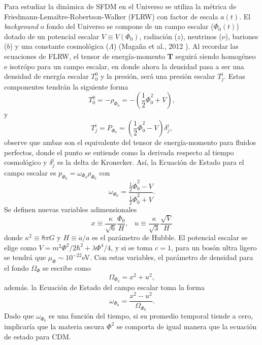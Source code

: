 \documentclass[a4paper,openright,12pt]{book}
\begin{document}
Para estudiar la dinámica de SFDM en el Universo se utiliza la métrica de Friedmann-Lemaître-Robertson-Walker (FLRW) con factor de escala $a(t)$. El \textit{background} o fondo del Universo se compone de un campo escalar ($\Phi_{0}(t)$) dotado de un potencial escalar $V \equiv V(\Phi_{0})$, radiación ($z$), neutrinos ($\nu$), bariones ($b$) y una constante cosmológica ($\Lambda$) (Magaña et al., 2012 \cite{1.3.02.1}). Al recordar las ecuaciones de FLRW, el tensor de energía-momento \textbf{T} seguirá siendo homogéneo e isotrópo para un campo escalar,  en donde ahora la densidad pasa a ser una densidad de energía escalar $T_{0}^{0}$ y la presión, será una presión escalar $T_{j}^{i}$. Estas componentes tendrán la siguiente forma
\begin{equation}
T_{0}^{0}=-\rho_{\Phi_{0}}=-\left(\frac{1}{2}\dot{\Phi}_{0}^{2} + V \right),\label{eqn 1.54}
\end{equation}
y
\begin{equation}
T_{j}^{i}=P_{\Phi_{0}}=\left(\frac{1}{2} \dot{\Phi}_{0}^{2}-V \right)\delta_{j}^{i},\label{eqn 1.55}
\end{equation}
observe que ambas son el equivalente del tensor de energía-momento para fluidos perfectos, donde el punto se entiende como la derivada respecto al tiempo cosmológico y $\delta_{j}^{i}$ es la delta de Kronecker. Así, la Ecuación de Estado para el campo escalar es $p_{\Phi_{0}}=\omega_{\Phi_{0}}\rho_{\Phi_{0}}$ con
\begin{equation}
\omega_{\Phi_{0}} = \frac{\frac{1}{2}\dot{\Phi}_{0}^{2}-V}{\frac{1}{2}\dot{\Phi}_{0}^{2}+V}.\label{eqn 1.56}
\end{equation}
Se definen nuevas variables adimensionales
\begin{equation}
x\equiv \frac{\kappa}{\sqrt{6}}\frac{\Phi_{0}}{H}, \;\;\; u\equiv\frac{\kappa}{\sqrt{3}}\frac{\sqrt{V}}{H}\label{eqn 1.57}
\end{equation}
donde $\kappa^{2}\equiv 8\pi G$ y $H \equiv \dot{a}/a$ es el parámetro de Hubble. El potencial escalar se elige como $V = m^{2}\Phi^{2}/2\hbar^{2} + \lambda\Phi^{4}/4$, y si se toma $c = 1$, para un bosón ultra ligero se tendrá que $\mu_{\Phi} \sim 10^{-22} $eV. Con estas variables, el parámetro de densidad para el fondo $\Omega_{\Phi}$ se escribe como
\begin{equation}
\Omega_{\Phi_{0}}= x^{2}+u^{2},\label{eqn 1.58}
\end{equation}
además. la Ecuación de Estado del campo escalar toma la forma
\begin{equation}
\omega_{\Phi_{0}}= \frac{x^{2}-u ^{2}}{\Omega_{\Phi_{0}}}.\label{eqn 1.59}
\end{equation}
Dado que $\omega_{\Phi_{0}}$ es una función del tiempo, si su promedio temporal tiende a cero, implicaría que la materia oscura $\Phi^{2}$ se comporta de igual manera que la ecuación de estado para CDM.
\end{document}
